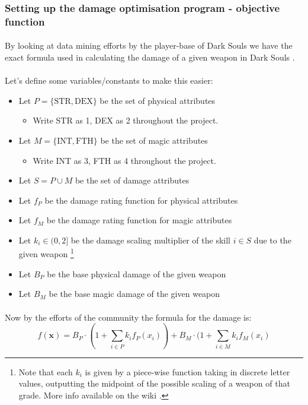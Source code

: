 \documentclass{article}
\begin{document}
\subsubsection{Setting up the damage optimisation program - objective function}
\paragraph{}By looking at data mining efforts by the player-base of Dark Souls we have the exact formula used in calculating the damage of a given weapon in Dark Souls \cite{dswiki-formula}.
\paragraph{}Let's define some variables/constants to make this easier:
\begin{itemize}
\item Let $P = \{\text{STR},\text{DEX}\}$ be the set of physical attributes
\begin{itemize}
\item Write STR as 1, DEX as 2 throughout the project.
\end{itemize}
\item Let $M = \{\text{INT},\text{FTH}\}$ be the set of magic attributes
\begin{itemize}
\item Write INT as 3, FTH as 4 throughout the project.
\end{itemize}
\item Let $S = P \cup M$ be the set of damage attributes
\item Let $f_P$ be the damage rating function for physical attributes
\item Let $f_M$ be the damage rating function for magic attributes
\item Let $k_i \in (0,2]$ be the damage scaling multiplier of the skill $i \in S$ due to the given weapon \footnote{Note that each $k_i$ is given by a piece-wise function taking in discrete letter values, outputting the midpoint of the possible scaling of a weapon of that grade. More info available on the wiki \cite{dswiki-formula}.}
\item Let $B_P$ be the base physical damage of the given weapon
\item Let $B_M$ be the base magic damage of the given weapon
\end{itemize}

\paragraph{}Now by the efforts of the community \cite{dswiki-formula} the formula for the damage is:
\begin{equation}
f(\boldsymbol{x}) = B_P\cdot (1 + \sum_{i \in P} k_i f_P(x_i)) + B_M \cdot (1 + \sum_{i \in M} k_i f_M(x_i)
\end{equation}
\end{document}
